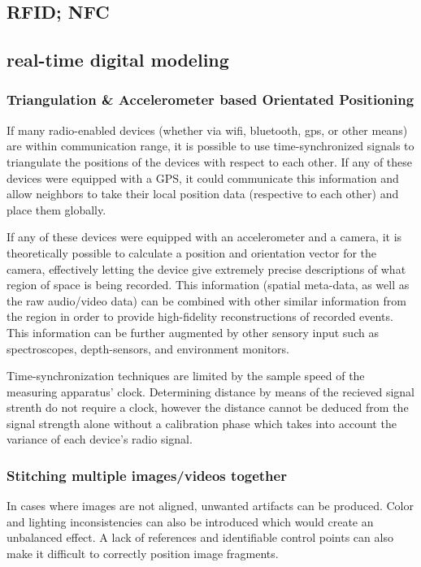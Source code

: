 \documentclass[final,a4paper,12pt]{report}
\begin{document}
\subsection{RFID; NFC}
\cite{5340296}
\subsection{real-time digital modeling}

\subsubsection{Triangulation \& Accelerometer based Orientated Positioning}

If many radio-enabled devices (whether via wifi, bluetooth, gps, or other means) are within communication range, it is possible to use time-synchronized signals to triangulate the positions of the devices with respect to each other. If any of these devices were equipped with a GPS, it could communicate this information and allow neighbors to take their local position data (respective to each other) and place them globally.

If any of these devices were equipped with an accelerometer and a camera, it is theoretically possible to calculate a position and orientation vector for the camera, effectively letting the device give extremely precise descriptions of what region of space is being recorded. This information (spatial meta-data, as well as the raw audio/video data) can be combined with other similar information from the region in order to provide high-fidelity reconstructions of recorded events. This information can be further augmented by other sensory input such as spectroscopes, depth-sensors, and environment monitors.

Time-synchronization techniques are limited by the sample speed of the measuring apparatus' clock. Determining distance by means of the recieved signal strenth do not require a clock, however the distance cannot be deduced from the signal strength alone without a calibration phase which takes into account the variance of each device's radio signal.

\subsubsection{Stitching multiple images/videos together}
In cases where images are not aligned, unwanted artifacts can be produced. Color and lighting inconsistencies can also be introduced which would create an unbalanced effect. A lack of references and identifiable control points can also make it difficult to correctly position image fragments. \cite{4359344}
\end{document}
